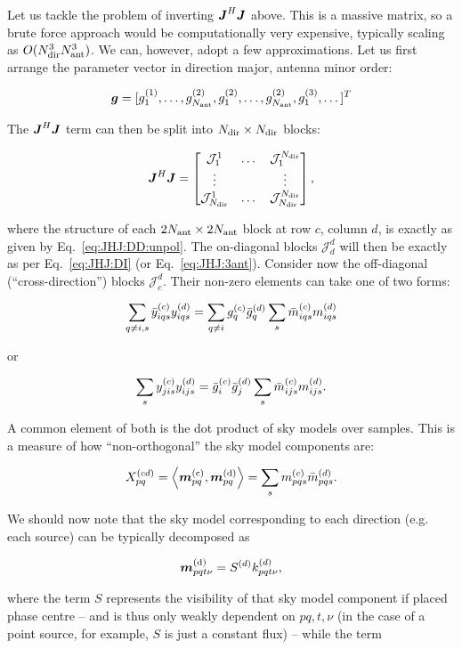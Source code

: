 \documentclass[useAMS,usenatbib]{mn2e}
\newcommand{\mat}[1]{{\bmath{#1}}}
\newcommand{\JJ}{\mat{J}} %
\newcommand{\JHJ}{\JJ^H\JJ} %
\begin{document}
Let us tackle the problem of inverting $\JHJ$ above. This is a massive matrix, so a brute force 
approach would be computationally very expensive, typically scaling as $O(N_\mathrm{dir}^3N_\mathrm{ant}^3)$. We can, 
however, adopt a few approximations. Let us first arrange the parameter vector in direction 
major, antenna minor order:

\[
\bmath{g} = [g^{(1)}_1,\dots,g^{(2)}_{N_\mathrm{ant}},g^{(2)}_1,\dots,g^{(2)}_{N_\mathrm{ant}},g^{(3)}_1,\dots ]^T
\]

The $\JHJ$ term can then be split into $N_\mathrm{dir}\times N_\mathrm{dir}$ blocks:

\newcommand{\JJJ}{\mathcal{J}}

\begin{equation}
\label{eq:JHJ:DD:blocked}
\JHJ = \Matrix{ccc}{\JJJ^1_1 & \dots & \JJJ^{\Nd}_1 \\
\vdots & & \vdots \\
\JJJ_{\Nd}^1 & \dots & \JJJ_{\Nd}^{\Nd} },
\end{equation}

where the structure of each $2N_\mathrm{ant}\times2N_\mathrm{ant}$ block at row $c$, column $d$, is exactly as 
given by Eq.~\ref{eq:JHJ:DD:unpol}. The on-diagonal blocks $\JJJ^d_d$ will then be exactly as per 
Eq.~\ref{eq:JHJ:DI} (or Eq.~\ref{eq:JHJ:3ant}). Consider now the off-diagonal (``cross-direction'') 
blocks $\JJJ^d_c$. Their non-zero elements can take one of two forms:

\[
  \sum\limits_{q\ne i,s} \bar{y}^{(c)}_{iqs} y^{(d)}_{iqs} = \sum\limits_{q\ne i} g^{(c)}_q \bar{g}^{(d)}_q \sum_s \bar{m}^{(c)}_{iqs} m^{(d)}_{iqs}
\]

or

\[
  \sum\limits_{s} y^{(c)}_{jis} y^{(d)}_{ijs} = \bar{g}^{(c)}_i \bar{g}^{(d)}_j \sum_s \bar{m}^{(c)}_{ijs} m^{(d)}_{ijs}.
\]

A common element of both is the dot product of sky models over samples. This is a measure of how ``non-orthogonal'' the 
sky model components are:

\begin{equation}
\label{eq:Xpqcd}
X_{pq}^{(cd)} = \left \langle \bmath{m}_{pq}^\mathrm{(c)},\bmath{m}^\mathrm{(d)}_{pq} \right \rangle = \sum_s \mmc_{pqs} \mmdH_{pqs}.
\end{equation}

We should now note that the sky model corresponding to each direction (e.g. each source) can be typically decomposed as

\[
\bmath{m}_{pqt\nu}^\mathrm{(d)} = S^{(d)} k^{(d)}_{pqt\nu}, 
\]

where the term $S$ represents the visibility of that sky model component if placed phase centre -- and is thus only 
weakly dependent on $pq,t,\nu$ (in the case of a point source, for example, $S$ is just a constant flux) -- while the term
\end{document}
